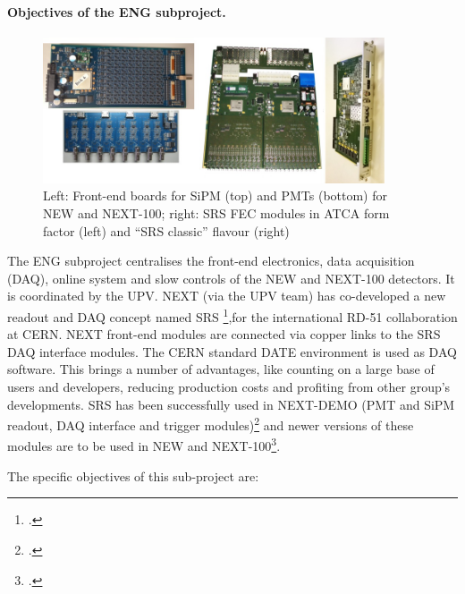 \paragraph{Objectives of the ENG subproject.}

\begin{figure}[h!]
\begin{center}
\includegraphics[width=0.9\textwidth]{img/Electronics.jpg}
\end{center}
\caption{\label{Fig:FEE} Left: Front-end boards for SiPM (top) and PMTs (bottom) for NEW and NEXT-100; right: SRS FEC modules in ATCA form factor (left) and “SRS classic” flavour (right) }
\end{figure}

The ENG subproject centralises the front-end electronics, data acquisition (DAQ), online system and slow controls of the NEW and NEXT-100 detectors. It is coordinated by the UPV.
NEXT (via the UPV team) has co-developed a new readout and DAQ concept named SRS \footcite{Toledo2011,SRS2013},for the international RD-51 collaboration at CERN. NEXT front-end modules are connected via copper links to the SRS DAQ interface modules. The CERN standard DATE environment is used as DAQ software. This brings a number of advantages, like counting on a large base of users and developers, reducing production costs and profiting from other group’s developments. SRS has been successfully used in NEXT-DEMO (PMT and SiPM readout, DAQ interface and trigger modules)\footcite{Gil2012,Herrero2012,Esteve2012} and newer versions of these modules are to be used in NEW and NEXT-100\footcite{TWEPP2014}.

The specific objectives of this sub-project are:

